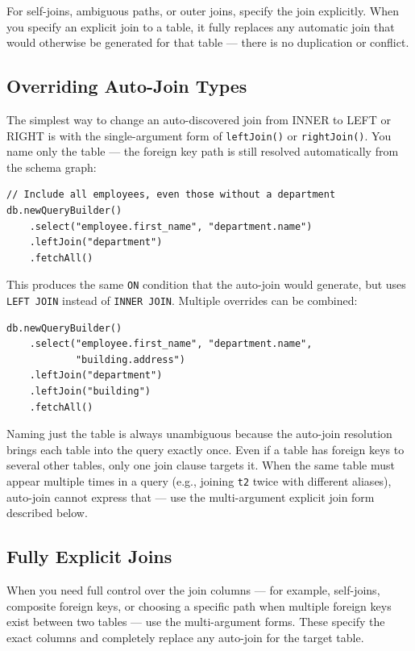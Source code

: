 For self-joins, ambiguous paths, or outer joins, specify the join explicitly.  When you specify an explicit join to a table, it fully replaces any automatic join that would otherwise be generated for that table --- there is no duplication or conflict.

\subsection{Overriding Auto-Join Types}

The simplest way to change an auto-discovered join from INNER to LEFT or RIGHT is with the single-argument form of \texttt{leftJoin()} or \texttt{rightJoin()}.  You name only the table --- the foreign key path is still resolved automatically from the schema graph:

\begin{lstlisting}[style=groovy]
// Include all employees, even those without a department
db.newQueryBuilder()
    .select("employee.first_name", "department.name")
    .leftJoin("department")
    .fetchAll()
\end{lstlisting}

\noindent
This produces the same \texttt{ON} condition that the auto-join would generate, but uses \texttt{LEFT JOIN} instead of \texttt{INNER JOIN}.  Multiple overrides can be combined:

\begin{lstlisting}[style=groovy]
db.newQueryBuilder()
    .select("employee.first_name", "department.name",
            "building.address")
    .leftJoin("department")
    .leftJoin("building")
    .fetchAll()
\end{lstlisting}

\begin{notebox}
Naming just the table is always unambiguous because the auto-join resolution brings each table into the query exactly once.  Even if a table has foreign keys to several other tables, only one join clause targets it.  When the same table must appear multiple times in a query (e.g., joining \texttt{t2} twice with different aliases), auto-join cannot express that --- use the multi-argument explicit join form described below.
\end{notebox}

\subsection{Fully Explicit Joins}

When you need full control over the join columns --- for example, self-joins, composite foreign keys, or choosing a specific path when multiple foreign keys exist between two tables --- use the multi-argument forms.  These specify the exact columns and completely replace any auto-join for the target table.


